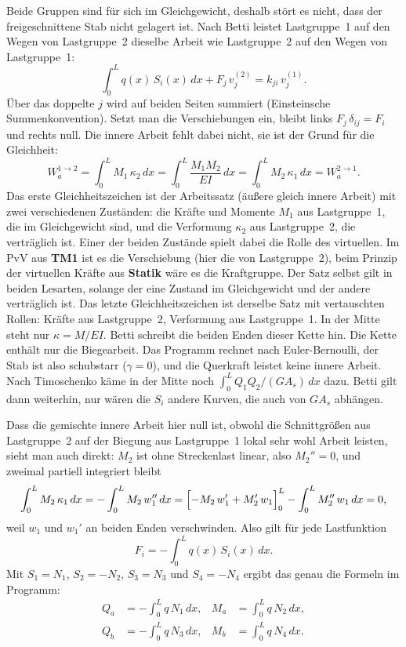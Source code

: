 Beide Gruppen sind für sich im Gleichgewicht, deshalb stört es nicht, dass der freigeschnittene
Stab nicht gelagert ist. Nach Betti leistet Lastgruppe~1 auf den Wegen von Lastgruppe~2 dieselbe
Arbeit wie Lastgruppe~2 auf den Wegen von Lastgruppe~1:
\[
  \int_0^L q(x)\,S_i(x)\,dx + F_j\,v_j^{(2)} = k_{ji}\,v_j^{(1)} .
\]
Über das doppelte $j$ wird auf beiden Seiten summiert (Einsteinsche Summenkonvention). Setzt man
die Verschiebungen ein, bleibt links $F_j\,\delta_{ij} = F_i$ und rechts null. Die innere Arbeit
fehlt dabei nicht, sie ist der Grund für die Gleichheit:
\[
  W_a^{1 \to 2} = \int_0^L M_1\,\kappa_2\,dx = \int_0^L \frac{M_1 M_2}{EI}\,dx
  = \int_0^L M_2\,\kappa_1\,dx = W_a^{2 \to 1} .
\]
Das erste Gleichheitszeichen ist der Arbeitssatz (äußere gleich innere Arbeit) mit zwei
verschiedenen Zuständen: die Kräfte und Momente $M_1$ aus Lastgruppe~1, die im Gleichgewicht sind,
und die Verformung $\kappa_2$ aus Lastgruppe~2, die verträglich ist. Einer der beiden Zustände
spielt dabei die Rolle des virtuellen. Im PvV aus \textbf{TM1} ist es die Verschiebung (hier die
von Lastgruppe~2), beim Prinzip der virtuellen Kräfte aus \textbf{Statik} wäre es die Kraftgruppe.
Der Satz selbst gilt in beiden Lesarten, solange der eine Zustand im Gleichgewicht und der andere
verträglich ist. Das letzte Gleichheitszeichen ist derselbe Satz mit vertauschten Rollen: Kräfte
aus Lastgruppe~2, Verformung aus Lastgruppe~1. In der Mitte steht nur $\kappa = M/EI$. Betti
schreibt die beiden Enden dieser Kette hin. Die Kette enthält nur die Biegearbeit. Das Programm rechnet nach Euler-Bernoulli, der Stab ist
also schubstarr ($\gamma = 0$), und die Querkraft leistet keine innere Arbeit. Nach Timoschenko käme
in der Mitte noch $\int_0^L Q_1 Q_2/(GA_s)\,dx$ dazu. Betti gilt dann weiterhin, nur wären die $S_i$
andere Kurven, die auch von $GA_s$ abhängen.

Dass die gemischte innere Arbeit hier null ist, obwohl die Schnittgrößen aus Lastgruppe~2 auf
der Biegung aus Lastgruppe~1 lokal sehr wohl Arbeit leisten, sieht man auch direkt: $M_2$ ist ohne
Streckenlast linear, also $M_2'' = 0$, und zweimal partiell integriert bleibt
\[
  \int_0^L M_2\,\kappa_1\,dx = -\int_0^L M_2\,w_1''\,dx
  = \Bigl[-M_2\,w_1' + M_2'\,w_1\Bigr]_0^L - \int_0^L M_2''\,w_1\,dx = 0 ,
\]
weil $w_1$ und $w_1'$ an beiden Enden verschwinden. Also gilt für jede Lastfunktion
\[
  F_i = -\int_0^L q(x)\,S_i(x)\,dx .
\]
Mit $S_1 = N_1$, $S_2 = -N_2$, $S_3 = N_3$ und $S_4 = -N_4$ ergibt das genau die Formeln im
Programm:
\begin{align*}
  Q_a &= -\int_0^L q\,N_1\,dx, & M_a &= \int_0^L q\,N_2\,dx, \\
  Q_b &= -\int_0^L q\,N_3\,dx, & M_b &= \int_0^L q\,N_4\,dx.
\end{align*}


